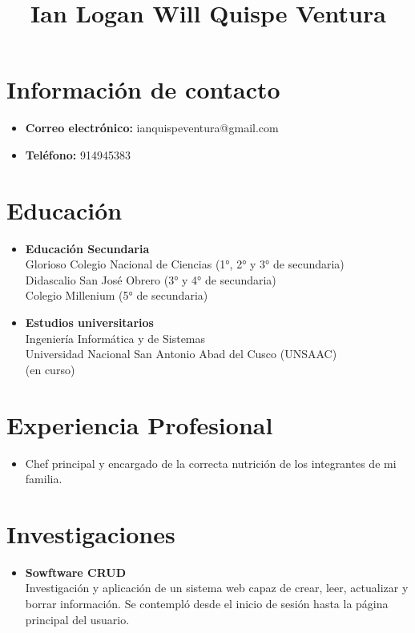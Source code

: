\documentclass{article}
\title{Ian Logan Will Quispe Ventura}
\date{}
\makeatletter
\newcommand{\nombre}{Tu Nombre}
\newcommand{\email}{ianquispeventura@gmail.com}
\newcommand{\celular}{914945383}
\makeatother
\begin{document}
\maketitle
\vspace{-1.2cm}
\section*{Información de contacto}
\begin{itemize}
    \item {\color{mygray}\textbf{Correo electrónico:}} \email
    \item {\color{mygray}\textbf{Teléfono:}} \celular
\end{itemize}

\section*{Educación}
\begin{itemize}
    \item {\color{mygray}\textbf{Educación Secundaria}} \\
    Glorioso Colegio Nacional de Ciencias (1°, 2° y 3° de secundaria) \\
    Didascalio San José Obrero (3° y 4° de secundaria) \\
    Colegio Millenium (5° de secundaria)
    
    \item {\color{mygray}\textbf{Estudios universitarios}} \\
        Ingeniería Informática y de Sistemas \\
    Universidad Nacional San Antonio Abad del Cusco (UNSAAC) \\
    (en curso)
\end{itemize}

\section*{Experiencia Profesional}
\begin{itemize}
    \item Chef principal y encargado de la correcta nutrición de los integrantes de mi familia.
\end{itemize}

\section*{Investigaciones}
\begin{itemize}
    \item {\color{mygray}\textbf{Sowftware CRUD}} \\
        Investigación y aplicación de un sistema web capaz de crear, leer, actualizar y borrar información. Se contempló desde el inicio de sesión hasta la página principal del usuario.
\end{itemize}
\end{document}
